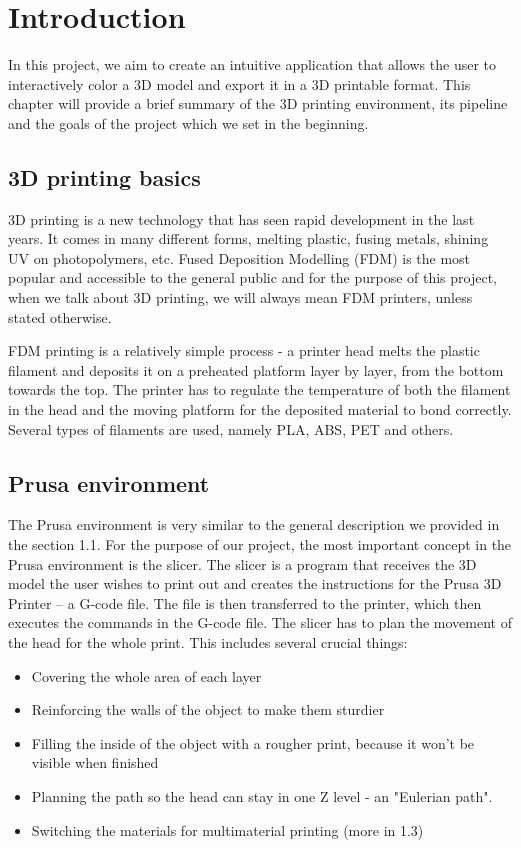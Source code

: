 \chapter{Introduction}

In this project, we aim to create an intuitive application that allows the user to interactively color a 3D model and export it in a 3D printable format. This chapter will provide a brief summary of the 3D printing environment, its pipeline and the goals of the project which we set in the beginning.

\section{3D printing basics}

3D printing is a new technology that has seen rapid development in the last years. It comes in many different forms, melting plastic, fusing metals, shining UV on photopolymers, etc. Fused Deposition Modelling (FDM) is the most popular and accessible to the general public and for the purpose of this project, when we talk about 3D printing, we will always mean FDM printers, unless stated otherwise.

FDM printing is a relatively simple process - a printer head melts the plastic filament and deposits it on a preheated platform layer by layer, from the bottom towards the top. The printer has to regulate the temperature of both the filament in the head and the moving platform for the deposited material to bond correctly. Several types of filaments are used, namely PLA, ABS, PET and others.

\section{Prusa environment}

The Prusa environment is very similar to the general description we provided in the section 1.1. For the purpose of our project, the most important concept in the Prusa environment is the slicer. The slicer is a program that receives the 3D model the user wishes to print out and creates the instructions for the Prusa 3D Printer -- a G-code file. The file is then transferred to the printer, which then executes the commands in the G-code file. The slicer has to plan the movement of the head for the whole print. This includes several crucial things:

\begin{itemize}
\item Covering the whole area of each layer
\item Reinforcing the walls of the object to make them sturdier
\item Filling the inside of the object with a rougher print, because it won't be visible when finished
\item Planning the path so the head can stay in one Z level - an "Eulerian path".
\item Switching the materials for multimaterial printing (more in 1.3)
\end{itemize}

